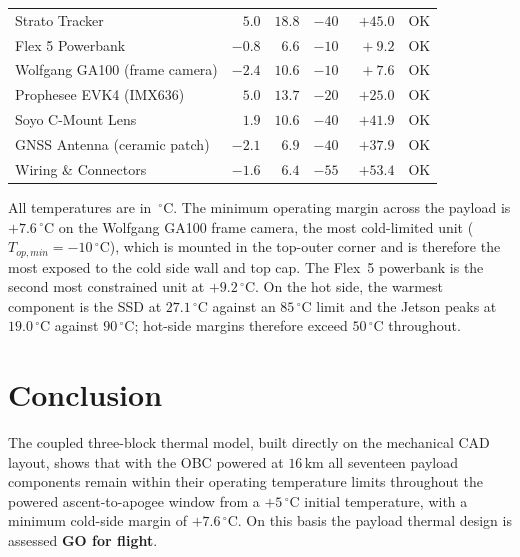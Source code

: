 \documentclass[11pt,a4paper]{article}
\newcommand{\degC}{\,^{\circ}\mathrm{C}}
\newcommand{\unit}[1]{\,\mathrm{#1}}
\begin{document}
\begin{table}[H]
\begin{tabular}{p{5.0cm} r r r r c}
Strato Tracker                 & $\phantom{0}5.0$ & $18.8$ & $-40$ & $+45.0$ & OK \\
Flex 5 Powerbank               & $-0.8$ & $\phantom{0}6.6$ & $-10$ & $\phantom{0}+9.2$ & OK \\
Wolfgang GA100 (frame camera)  & $-2.4$ & $10.6$ & $-10$ & $\phantom{0}+7.6$ & OK \\
Prophesee EVK4 (IMX636)        & $\phantom{0}5.0$ & $13.7$ & $-20$ & $+25.0$ & OK \\
Soyo C-Mount Lens              & $\phantom{0}1.9$ & $10.6$ & $-40$ & $+41.9$ & OK \\
GNSS Antenna (ceramic patch)   & $-2.1$ & $\phantom{0}6.9$ & $-40$ & $+37.9$ & OK \\
Wiring \& Connectors           & $-1.6$ & $\phantom{0}6.4$ & $-55$ & $+53.4$ & OK \\
\bottomrule
\end{tabular}
\end{table}

All temperatures are in $\degC$. The minimum operating margin across the payload is
$+7.6\degC$ on the Wolfgang GA100 frame camera, the most cold-limited unit
($T_{op,min}=-10\degC$), which is mounted in the top-outer corner and is therefore the
most exposed to the cold side wall and top cap. The Flex~5 powerbank is the second most
constrained unit at $+9.2\degC$. On the hot side, the warmest component is the SSD at
$27.1\degC$ against an $85\degC$ limit and the Jetson peaks at $19.0\degC$ against
$90\degC$; hot-side margins therefore exceed $50\degC$ throughout.

\section{Conclusion}
The coupled three-block thermal model, built directly on the mechanical CAD layout,
shows that with the OBC powered at $16\unit{km}$ all seventeen payload components remain
within their operating temperature limits throughout the powered ascent-to-apogee
window from a $+5\degC$ initial temperature, with a minimum cold-side margin of
$+7.6\degC$. On this basis the payload thermal design is assessed
\textbf{GO for flight}.
\end{document}

